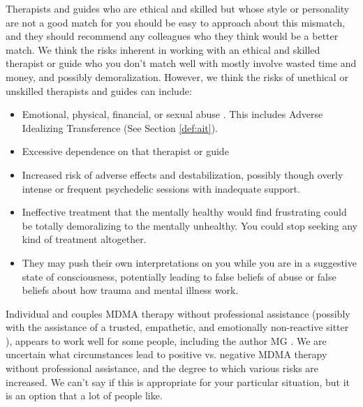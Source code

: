 \documentclass[12pt,letterpaper]{book}
\begin{document}
Therapists and guides who are ethical and skilled but whose style or personality are not a good match for you should be easy to approach about this mismatch, and they should recommend any colleagues who they think would be a better match. We think the risks inherent in working with an ethical and skilled therapist or guide who you don't match well with mostly involve wasted time and money, and possibly demoralization. However, we think the risks of unethical or unskilled therapists and guides can include:
\begin{itemize}
    \item Emotional, physical, financial, or sexual abuse \cite{powerTrip}. This includes Adverse Idealizing Transference (See Section \ref{def:ait}).
    \item Excessive dependence on that therapist or guide \cite{powerTrip}
    \item Increased risk of adverse effects and destabilization, possibly though overly intense or frequent psychedelic sessions with inadequate support.
    \item Ineffective treatment that the mentally healthy would find frustrating could be totally demoralizing to the mentally unhealthy. You could stop seeking any kind of treatment altogether.
    \item They may push their own interpretations on you while you are in a suggestive state of consciousness, potentially leading to false beliefs of abuse \cite{Scoboria07022017} or false beliefs about how trauma and mental illness work.
\end{itemize}

Individual and couples MDMA therapy without professional assistance (possibly with the assistance of a trusted, empathetic, and emotionally non-reactive sitter \cite{thalSitter}), appears to work well for some people, including the author MG \cite{hillsSolo,colbertEvenings}. We are uncertain what circumstances lead to positive vs. negative MDMA therapy without professional assistance, and the degree to which various risks are increased. We can't say if this is appropriate for your particular situation, but it is an option that a lot of people like.
\end{document}
